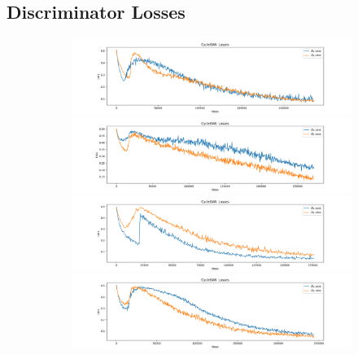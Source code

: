 \documentclass[12pt, fleqn, titlepage]{article}
\begin{document}
\subsection{Discriminator Losses}\label{disc_loss}
\begin{figure}[H]
	\centering
	\begin{subfigure}[b]{0.8\textwidth}
		\centering
		\includegraphics[width=\linewidth]{imgs/discriminator_losses/XY_model_discriminator_losses}
		\hfill
		\includegraphics[width=\linewidth]{imgs/discriminator_losses/XZ_model_discriminator_losses}
		\hfill
		\includegraphics[width=\linewidth]{imgs/discriminator_losses/YZ_model_discriminator_losses}
		\hfill
		\includegraphics[width=\linewidth]{imgs/discriminator_losses/ALL_model_discriminator_losses}
	\end{subfigure}
\end{figure}
\end{document}
